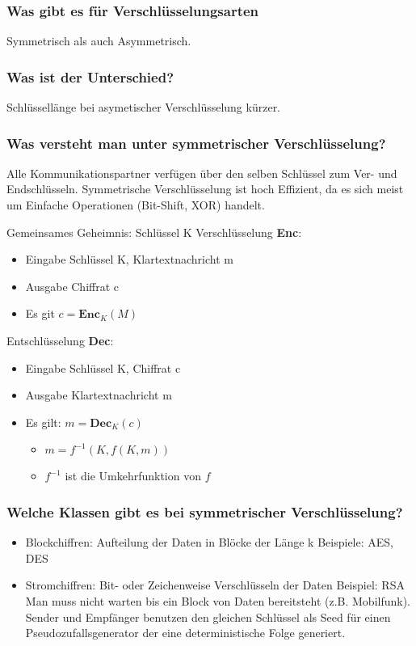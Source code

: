 		\subsubsection{Was gibt es für Verschlüsselungsarten}
	Symmetrisch als auch Asymmetrisch.
	
		
	\subsubsection{Was ist der Unterschied?}
	Schlüssellänge bei asymetischer Verschlüsselung kürzer.
	
	\subsubsection{Was versteht man unter symmetrischer Verschlüsselung?}
	Alle Kommunikationspartner verfügen über den selben Schlüssel zum Ver- und Endschlüsseln. Symmetrische Verschlüsselung ist hoch Effizient, da es sich meist um Einfache Operationen (Bit-Shift, XOR) handelt.
	
	Gemeinsames Geheimnis: Schlüssel K
	Verschlüsselung \textbf{Enc}:
		\begin{itemize}
			\item Eingabe Schlüssel K, Klartextnachricht m
			\item Ausgabe Chiffrat c
			\item Es git $c=\textbf{Enc}_K(M)$
		\end{itemize}
	Entschlüsselung \textbf{Dec}:
		\begin{itemize}
			\item Eingabe Schlüssel K, Chiffrat c
			\item Ausgabe Klartextnachricht m
			\item Es gilt: $m = \textbf{Dec}_K(c)$
				\begin{itemize}
					\item $m = f^{-1}(K,f(K,m))$
					\item $f^{-1}$ ist die Umkehrfunktion von $f$
				\end{itemize}
		\end{itemize}
		
	\subsubsection{Welche Klassen gibt es bei symmetrischer Verschlüsselung?}
	\begin{itemize}
		\item Blockchiffren: Aufteilung der Daten in Blöcke der Länge k
		Beispiele: AES, DES
		
		\item Stromchiffren: Bit- oder Zeichenweise Verschlüsseln der Daten
		Beispiel: RSA
		Man muss nicht warten bis ein Block von Daten bereitsteht (z.B. Mobilfunk). Sender und Empfänger benutzen den gleichen Schlüssel als Seed für einen Pseudozufallsgenerator der eine deterministische Folge generiert.
	\end{itemize}
	
